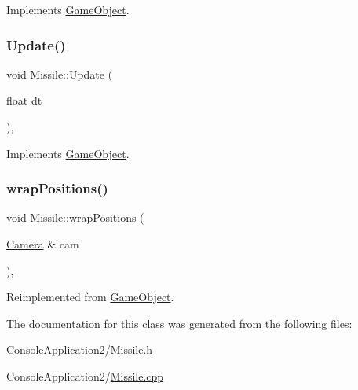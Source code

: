 Implements \hyperlink{class_game_object_a8a3c07e92775fe00baa9e661fefb224e}{Game\+Object}.

\hypertarget{class_missile_a75c5c4613f289d4d0ad806743e7d40f7}{}\label{class_missile_a75c5c4613f289d4d0ad806743e7d40f7} 
\subsubsection{\texorpdfstring{Update()}{Update()}}
{\footnotesize\ttfamily void Missile\+::\+Update (\begin{DoxyParamCaption}\item[{float}]{dt }\end{DoxyParamCaption})\hspace{0.3cm}{\ttfamily [override]}, {\ttfamily [virtual]}}



Implements \hyperlink{class_game_object_a93ed63df640deb516a020530e7f8e045}{Game\+Object}.

\hypertarget{class_missile_ae4d7aa6babf40ea774097bfa0f7c9ff7}{}\label{class_missile_ae4d7aa6babf40ea774097bfa0f7c9ff7} 
\subsubsection{\texorpdfstring{wrap\+Positions()}{wrapPositions()}}
{\footnotesize\ttfamily void Missile\+::wrap\+Positions (\begin{DoxyParamCaption}\item[{\hyperlink{class_camera}{Camera} \&}]{cam }\end{DoxyParamCaption})\hspace{0.3cm}{\ttfamily [override]}, {\ttfamily [virtual]}}



Reimplemented from \hyperlink{class_game_object_a53b129d55688652e25e6515d80e669ca}{Game\+Object}.



The documentation for this class was generated from the following files\+:\begin{DoxyCompactItemize}
\item 
Console\+Application2/\hyperlink{_missile_8h}{Missile.\+h}\item 
Console\+Application2/\hyperlink{_missile_8cpp}{Missile.\+cpp}\end{DoxyCompactItemize}

